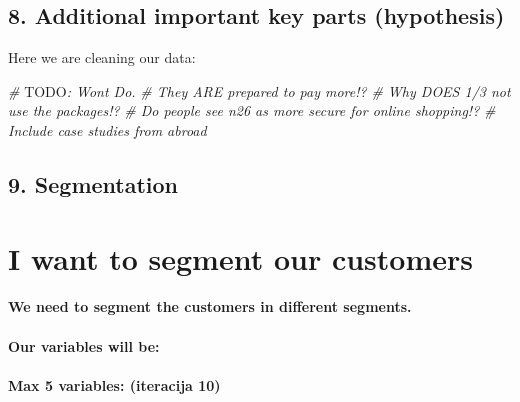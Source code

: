 \documentclass[
]{article}
\newenvironment{Shaded}{\begin{snugshade}}{\end{snugshade}}
\newcommand{\AlertTok}[1]{\textcolor[rgb]{0.94,0.16,0.16}{#1}}
\newcommand{\CommentTok}[1]{\textcolor[rgb]{0.56,0.35,0.01}{\textit{#1}}}
\begin{document}
\hypertarget{additional-important-key-parts-hypothesis}{%
\subsection{8. Additional important key parts
(hypothesis)}\label{additional-important-key-parts-hypothesis}}

Here we are cleaning our data:

\begin{Shaded}
\begin{Highlighting}[]
\CommentTok{\# }\AlertTok{TODO}\CommentTok{: Wont Do.}
\CommentTok{\# They ARE prepared to pay more!?}
\CommentTok{\# Why DOES 1/3 not use the packages!?}
\CommentTok{\# Do people see n26 as more secure for online shopping!?}
\CommentTok{\# Include case studies from abroad}
\end{Highlighting}
\end{Shaded}

\hypertarget{segmentation}{%
\subsection{9. Segmentation}\label{segmentation}}

\hypertarget{i-want-to-segment-our-customers}{%
\section{I want to segment our
customers}\label{i-want-to-segment-our-customers}}

\hypertarget{we-need-to-segment-the-customers-in-different-segments.}{%
\paragraph{We need to segment the customers in different
segments.}\label{we-need-to-segment-the-customers-in-different-segments.}}

\hypertarget{our-variables-will-be}{%
\paragraph{Our variables will be:}\label{our-variables-will-be}}

\hypertarget{max-5-variables-iteracija-10}{%
\paragraph{Max 5 variables: (iteracija
10)}\label{max-5-variables-iteracija-10}}
\end{document}
